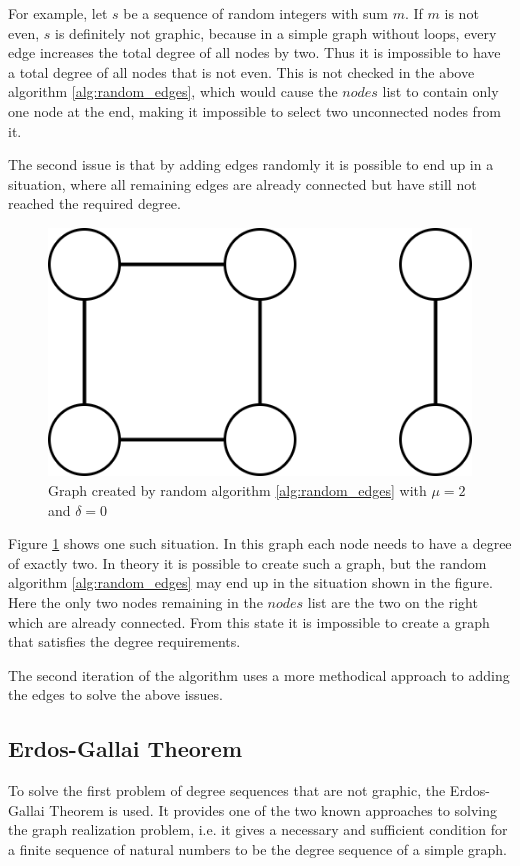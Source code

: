 For example, let $s$ be a sequence of random integers with sum $m$. If $m$ is not even, $s$ is definitely not graphic, because in a simple graph without loops, every edge increases the total degree of all nodes by two. Thus it is impossible to have a total degree of all nodes that is not even. This is not checked in the above algorithm \ref{alg:random_edges}, which would cause the $nodes$ list to contain only one node at the end, making it impossible to select two unconnected nodes from it.
\newline

The second issue is that by adding edges randomly it is possible to end up in a situation, where all remaining edges are already connected but have still not reached the required degree.

\begin{figure}
    \centering
    \includegraphics[width=0.5\linewidth]{images/impossible_graph.png}
    \caption{Graph created by random algorithm \ref{alg:random_edges} with $\mu=2$ and $\delta=0$}
    \label{fig:impossible_graph}
\end{figure}

Figure \ref{fig:impossible_graph} shows one such situation. In this graph each node needs to have a degree of exactly two. In theory it is possible to create such a graph, but the random algorithm \ref{alg:random_edges} may end up in the situation shown in the figure. Here the only two nodes remaining in the $nodes$ list are the two on the right which are already connected. From this state it is impossible to create a graph that satisfies the degree requirements.
\newline

The second iteration of the algorithm uses a more methodical approach to adding the edges to solve the above issues.

\subsection{Erdos-Gallai Theorem}
To solve the first problem of degree sequences that are not graphic, the Erdos-Gallai Theorem is used. It provides one of the two known approaches to solving the graph realization problem, i.e. it gives a necessary and sufficient condition for a finite sequence of natural numbers to be the degree sequence of a simple graph.

